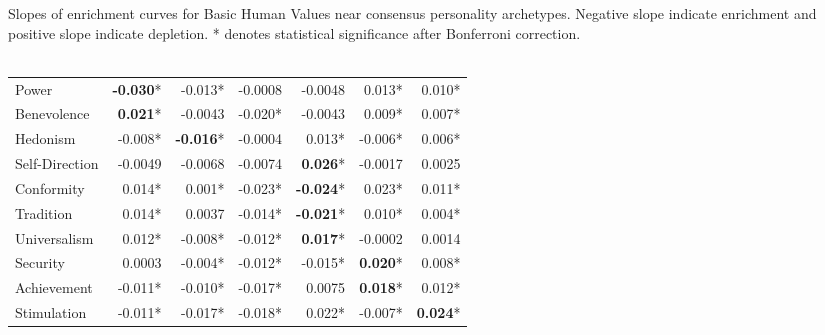 Slopes of enrichment curves for Basic Human Values near consensus personality archetypes. Negative slope indicate enrichment and positive slope indicate depletion. * denotes statistical significance after Bonferroni correction.\\\\


{
\centering
\footnotesize
\begin{tabular}{lrrrrrr}
\toprule
{} 					& \smallachiever 	& \smallhost 		& \smallwildcard & \smallloyalist & \smallhippie 	&  \smallfollower \\
\midrule
Power	 			& \textbf{-0.030}* 	& -0.013* 			& -0.0008 	& -0.0048 			&  0.013* 			&  0.010* \\
Benevolence	 		& \textbf{ 0.021}* 	& -0.0043 			& -0.020* 	& -0.0043 			&  0.009* 			&  0.007* \\
Hedonism	 		& -0.008* 			& \textbf{-0.016}* 	& -0.0004 	&  0.013* 			& -0.006* 			&  0.006* \\
Self-Direction		& -0.0049 			& -0.0068 			& -0.0074 	& \textbf{ 0.026}* 	& -0.0017 			&  0.0025 \\
Conformity	 		&  0.014* 			&  0.001* 			& -0.023* 	& \textbf{-0.024}* 	&  0.023* 			&  0.011* \\
Tradition	 		&  0.014* 			&  0.0037 			& -0.014* 	& \textbf{-0.021}* 	&  0.010* 			&  0.004* \\
Universalism 		&  0.012* 			& -0.008* 			& -0.012* 	& \textbf{ 0.017}* 	& -0.0002 			&  0.0014 \\
Security	 		&  0.0003 			& -0.004* 			& -0.012* 	& -0.015* 			&  \textbf{0.020}* &  0.008* \\
Achievement	 		& -0.011* 			& -0.010* 			& -0.017* 	&  0.0075 			&  \textbf{0.018}* &  0.012* \\
Stimulation	 		& -0.011* 			& -0.017* 			& -0.018* 	&  0.022* 			& -0.007* 			&  \textbf{0.024}* \\
\bottomrule
\end{tabular}
}